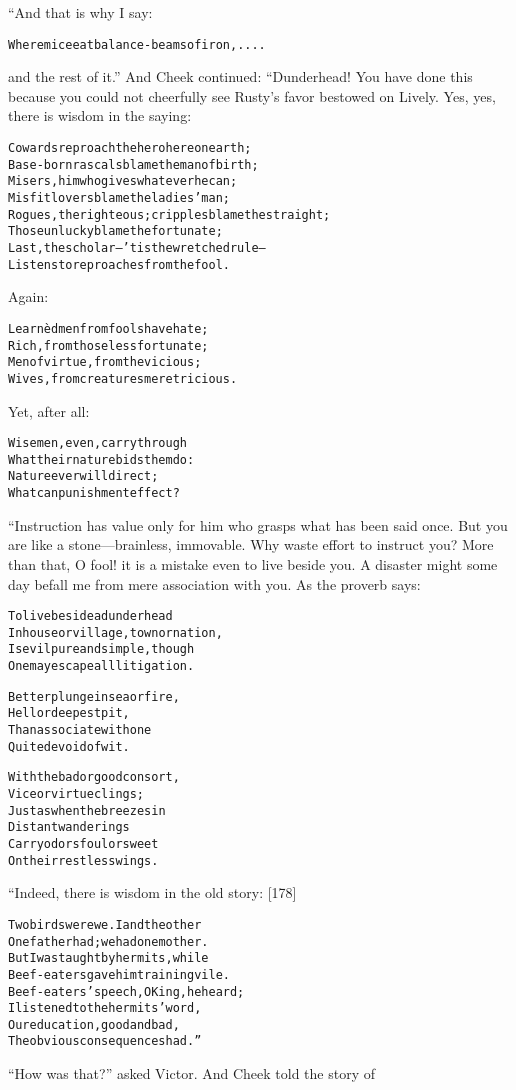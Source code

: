 \documentclass{article}
\renewenvironment{verbatim}{\begin{alltt}\normalfont\begin{centering}}{\end{centering}\end{alltt}}
\begin{document}
“And that is why I say:

\begin{verbatim}
Where mice eat balance-beams of iron, ....
\end{verbatim}
and the rest of it.” And Cheek continued: “Dunderhead! You have
done this because you could not cheerfully see Rusty's favor
bestowed on Lively. Yes, yes, there is wisdom in the saying:

\begin{verbatim}
Cowards reproach the hero here on earth;
Base-born rascals blame the man of birth;
Misers, him who gives whatever he can;
Misfit lovers blame the ladies' man;
Rogues, the righteous; cripples blame the straight;
Those unlucky blame the fortunate;
Last, the scholar--'tis the wretched rule--
Listens to reproaches from the fool.
\end{verbatim}
Again:

\begin{verbatim}
Learnèd men from fools have hate;
Rich, from those less fortunate;
Men of virtue, from the vicious;
Wives, from creatures meretricious.
\end{verbatim}
Yet, after all:

\begin{verbatim}
Wise men, even, carry through
What their nature bids them do:
Nature ever will direct;
What can punishment effect?
\end{verbatim}
“Instruction has value only for him who grasps what has been said
once. But you are like a stone---brainless, immovable. Why waste
effort to instruct you? More than that, O fool! it is a mistake
even to live beside you. A disaster might some day befall me from
mere association with you. As the proverb says:

\begin{verbatim}
To live beside a dunderhead
    In house or village, town or nation,
Is evil pure and simple, though
    One may escape all litigation.

Better plunge in sea or fire,
    Hell or deepest pit,
Than associate with one
    Quite devoid of wit.

With the bad or good consort,
    Vice or virtue clings;
Just as when the breezes in
    Distant wanderings
Carry odors foul or sweet
    On their restless wings.
\end{verbatim}
“Indeed, there is wisdom in the old story: [178]

\begin{verbatim}
Two birds were we. I and the other
One father had; we had one mother.
But I was taught by hermits, while
Beef-eaters gave him training vile.
Beef-eaters' speech, O King, he heard;
I listened to the hermits' word,
Our education, good and bad,
The obvious consequences had.”
\end{verbatim}
``How was that?'' asked Victor. And Cheek told the story of
\end{document}
